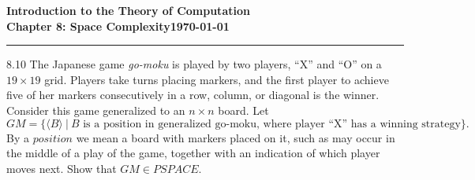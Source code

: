 \documentclass[11pt]{article}
\newcommand{\dated}{\today}
\begin{document}
\textbf{Introduction to the Theory of
Computation}\hfill\textbf{\myname}\\[0.01in]
\textbf{Chapter 8: Space Complexity}\hfill\textbf{\dated}\\
\smallskip\hrule\bigskip

\begin{problem}{8.10}
The Japanese game \textit{go-moku} is played by two players, ``X'' and ``O'' on a \mbox{$19 \times 19$} grid. Players take turns placing markers, and the first player to achieve five of her markers consecutively in a row, column, or diagonal is the winner. Consider this game generalized to an $n \times n$ board. Let
\[
GM = \{\langle B \rangle \ | \ B \text{ is a position in generalized go-moku, where player ``X'' has a winning strategy}\}.
\]
By a $position$ we mean a board with markers placed on it, such as may occur in the middle of a play of the game, together with an indication of which player moves next. Show that $GM \in PSPACE$.
\end{problem}
\end{document}
